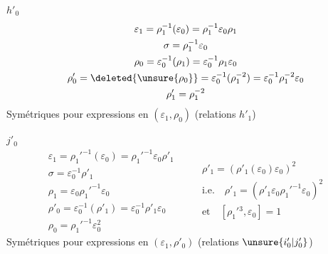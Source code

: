 \textcircled{$h'_0$}
\[
\begin{gathered}
\varepsilon_1=\rho_1^{-1}(\varepsilon_0)=\rho_1^{-1}\varepsilon_0\rho_1\\
\sigma=\rho_1^{-1}\varepsilon_0\\
\rho_0=\varepsilon_0^{-1}(\rho_1)=\varepsilon_0^{-1}\rho_1\varepsilon_0\\
\rho'_0=\deleted{\unsure{\rho_0}}=\varepsilon_0^{-1}(\rho_1^{-2})=\varepsilon_0^{-1}\rho_1^{-2}\varepsilon_0\\
\rho'_1=\rho_1^{-2}
\end{gathered}
\]
Symétriques pour expressions en $(\varepsilon_1,\rho_0)$ (relations $h'_1$)

\textcircled{$j'_0$}
\[
\begin{gathered}
\varepsilon_1=\rho_1'^{-1}(\varepsilon_0)=\rho_1'^{-1}\varepsilon_0\rho'_1\\
\sigma=\varepsilon_0^{-1}\rho'_1\\
\rho_1=\varepsilon_0\rho_1'^{-1}\varepsilon_0\\
\rho'_0=\varepsilon_0^{-1}(\rho'_1)=\varepsilon_0^{-1}\rho'_1\varepsilon_0\\
\rho_0=\rho_1'^{-1}\varepsilon_0^2
\end{gathered}
\qquad
\boxed{\begin{gathered}
\rho'_1=(\rho'_1(\varepsilon_0)\varepsilon_0)^2\\
\text{i.e.}\quad\rho'_1=(\rho'_1\varepsilon_0\rho_1'^{-1}\varepsilon_0)^2\\
\text{et}\quad[\rho_1'{}^3,\varepsilon_0]=1
\end{gathered}}
\]
Symétriques pour expressions en $(\varepsilon_1,\rho'_0)$ (relations  $\unsure{i'_0|j'_0}$)

